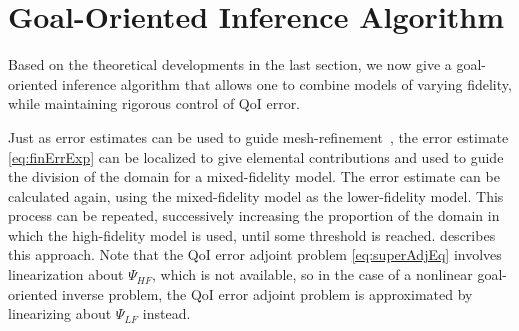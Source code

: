 \section{Goal-Oriented Inference Algorithm}\label{sect:alg}
%
Based on the theoretical developments in the last section, we now give a goal-oriented inference algorithm that allows one to combine models of varying fidelity, while maintaining rigorous control of QoI error.

Just as error estimates can be used to guide mesh-refinement~\cite{BecRann01}, the error estimate \cref{eq:finErrExp} can be localized to give elemental contributions and used to guide the division of the domain for a mixed-fidelity model. The error estimate can be calculated again, using the mixed-fidelity model as the lower-fidelity model. This process can be repeated, successively increasing the proportion of the domain in which the high-fidelity model is used, until some threshold is reached.  describes this approach. Note that the QoI error adjoint problem \cref{eq:superAdjEq} involves linearization about $\Psi_{HF}$, which is not available, so in the case of a nonlinear goal-oriented inverse problem, the QoI error adjoint problem is approximated by linearizing about $\Psi_{LF}$ instead.
%
